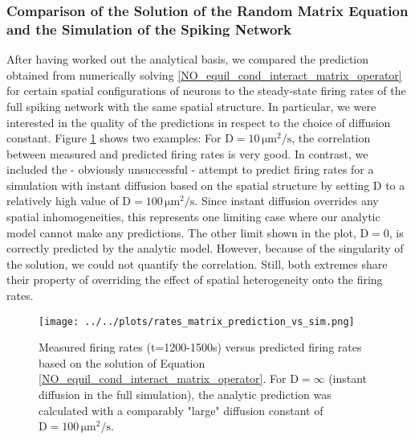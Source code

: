 \documentclass[10pt,a4paper]{article}
\begin{document}
\subsubsection{Comparison of the Solution of the Random Matrix Equation and the Simulation of the Spiking Network}
After having worked out the analytical basis, we compared the prediction obtained from numerically solving \eqref{NO_equil_cond_interact_matrix_operator} for certain spatial configurations of neurons to the steady-state firing rates of the full spiking network with the same spatial structure. In particular, we were interested in the quality of the predictions in respect to the choice of diffusion constant. Figure \ref{Rand_Matrix_Sol_vs_Sim} shows two examples: For $\mathrm{D=10\, \mu m^2 /s}$, the correlation between measured and predicted firing rates is very good. In contrast, we included the - obviously unsuccessful - attempt to predict firing rates for a simulation with instant diffusion based on the spatial structure by setting D to a relatively high value of $\mathrm{D=100\, \mu m^2 /s}$. Since instant diffusion overrides any spatial inhomogeneities, this represents one limiting case where our analytic model cannot make any predictions. The other limit shown in the plot, $\mathrm{D=0}$, is correctly predicted by the analytic model. However, because of the singularity of the solution, we could not quantify the correlation. Still, both extremes share their property of overriding the effect of spatial heterogeneity onto the firing rates. 

\begin{figure}
\texttt{[image: ../../plots/rates\_matrix\_prediction\_vs\_sim.png]}
\caption{Measured firing rates (t=1200-1500s) versus predicted firing rates based on the solution of Equation \eqref{NO_equil_cond_interact_matrix_operator}. For $\mathrm{D=\infty}$ (instant diffusion in the full simulation), the analytic prediction was calculated with a comparably "large" diffusion constant of $\mathrm{D=100\, \mu m^2 /s}$.}
\label{Rand_Matrix_Sol_vs_Sim}
\end{figure}
\end{document}
